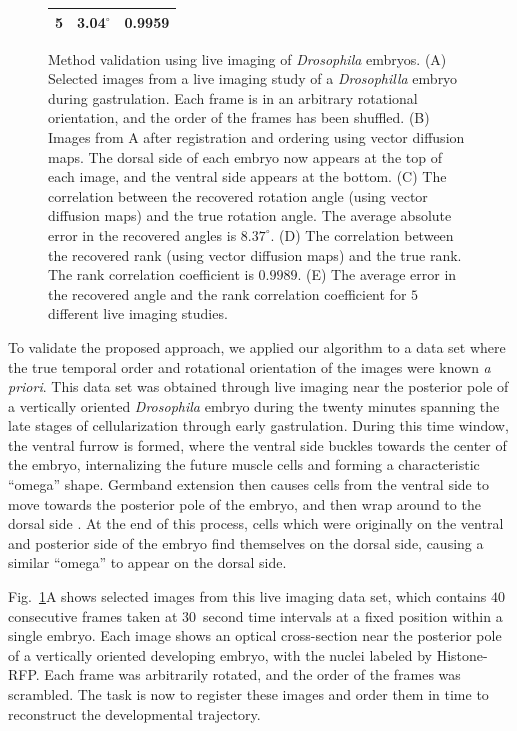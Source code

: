 \documentclass[twocolumn, 10pt]{article}
\newcommand{\fig}[0]{Fig.}
\begin{document}
\begin{figure}[t]
{{{\begin{tabular}{ |c | c| c| }
5 & 3.04$^{\circ}$ & 0.9959 \\ 
 \hline
\end{tabular}}}}
\caption{Method validation using live imaging of \textit{Drosophila} embryos. (A) Selected images from a live imaging study of a \textit{Drosophilla} embryo during gastrulation. Each frame is in an arbitrary rotational orientation, and the order of the frames has been shuffled. (B) Images from A after registration and ordering using vector diffusion maps. The dorsal side of each embryo now appears at the top of each image, and the ventral side appears at the bottom. (C) The correlation between the recovered rotation angle (using vector diffusion maps) and the true rotation angle. The average absolute error in the recovered angles is $8.37 ^\circ$. (D) The correlation between the recovered rank (using vector diffusion maps) and the true rank. The rank correlation coefficient is $0.9989$. (E) The average error in the recovered angle and the rank correlation coefficient for $5$ different live imaging studies. }
\label{fig:drosophila_live_imaging}
\end{figure}

To validate the proposed approach, we applied our algorithm to a data set where the true temporal order and rotational orientation of the images were known {\em a priori}.
%
This data set was obtained through live imaging near the posterior pole of a vertically oriented {\it Drosophila} embryo during the twenty minutes spanning the late stages of cellularization through early gastrulation.
%
During this time window, the ventral furrow is formed, where the ventral side buckles towards the center of the embryo, internalizing the future muscle cells and forming a characteristic ``omega'' shape.
%
Germband extension then causes cells from the ventral side to move towards the posterior pole of the embryo, and then wrap around to the dorsal side \citep{leptin2005gastrulation}.
%
At the end of this process, cells which were originally on the ventral and posterior side of the embryo find themselves on the dorsal side, causing a similar ``omega'' to appear on the dorsal side.

\fig~\ref{fig:drosophila_live_imaging}A shows selected images from this live imaging data set, which contains $40$ consecutive frames taken at $30$~second time intervals at a fixed position within a single embryo.
%
Each image shows an optical cross-section near the posterior pole of a vertically oriented developing embryo, with the nuclei labeled by Histone-RFP.
%
Each frame was arbitrarily rotated, and the order of the frames was scrambled.
%
The task is now to register these images and order them in time to reconstruct the developmental trajectory.
\end{document}
